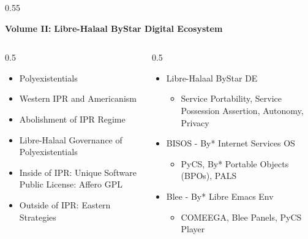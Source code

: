 \begin{whenOrg}
\begin{verblatex}
\begin{frame}[fragile,plain,label=twoVolumesConcepts]
\begin{columns}
      \begin{column}{0.55\textwidth}

        \begin{center}
          \colorbox{blue!60}{\color{white} \textbf{Volume II:}}
          \colorbox{blue!60}{\color{white} \textbf{Libre-Halaal ByStar Digital Ecosystem}}
        \end{center}
      \end{column}

    \end{columns}

    \bigskip

    \begin{columns}

      \begin{column}{0.5\textwidth}

        \begin{itemize}
          \item Polyexistentials
          \item Western IPR and Americanism
          \item Abolishment of IPR Regime
          \item Libre-Halaal Governance of Polyexistentials
          \item Inside of IPR: Unique Software Public License: Affero GPL
          \item Outside of IPR: Eastern Strategies
        \end{itemize}
      \end{column}

      \begin{column}{0.5\textwidth}

        \begin{itemize}
          \item Libre-Halaal ByStar DE
                \begin{itemize}
                  \item Service Portability, Service Possession Assertion, Autonomy, Privacy
                \end{itemize}
          \item BISOS - By* Internet Services OS
                \begin{itemize}
                  \item PyCS, By* Portable Objects (BPOs), PALS
                \end{itemize}
          \item Blee - By* Libre Emacs Env
                \begin{itemize}
                  \item COMEEGA, Blee Panels, PyCS Player
                \end{itemize}
        \end{itemize}
      \end{column}


\end{columns}
\end{frame}
\end{verblatex}
\end{whenOrg}
